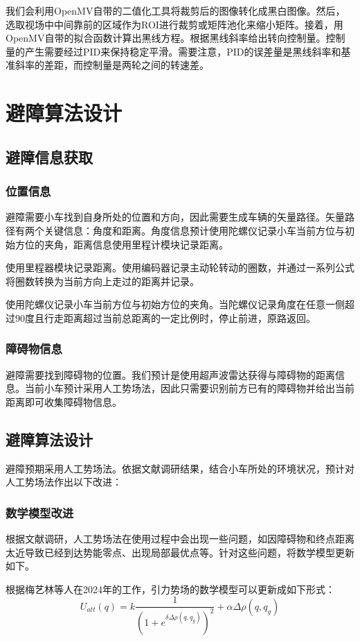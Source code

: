 \documentclass{report}
\begin{document}
我们会利用OpenMV自带的二值化工具将裁剪后的图像转化成黑白图像。然后，选取视场中中间靠前的区域作为ROI进行裁剪或矩阵池化来缩小矩阵。接着，用OpenMV自带的拟合函数计算出黑线方程。根据黑线斜率给出转向控制量。控制量的产生需要经过PID来保持稳定平滑。需要注意，PID的误差量是黑线斜率和基准斜率的差距，而控制量是两轮之间的转速差。
\section{避障算法设计}
\label{sec:label}
\subsection{避障信息获取}
\label{subsec:label}
\subsubsection{位置信息}
\label{subsec:label}
避障需要小车找到自身所处的位置和方向，因此需要生成车辆的矢量路径。矢量路径有两个关键信息：角度和距离。角度信息预计使用陀螺仪记录小车当前方位与初始方位的夹角，距离信息使用里程计模块记录距离。

使用里程器模块记录距离。使用编码器记录主动轮转动的圈数，并通过一系列公式将圈数转换为当前方向上走过的距离并记录。

使用陀螺仪记录小车当前方位与初始方位的夹角。当陀螺仪记录角度在任意一侧超过90度且行走距离超过当前总距离的一定比例时，停止前进，原路返回。

\subsubsection{障碍物信息}
\label{subsec:label}
避障需要找到障碍物的位置。我们预计是使用超声波雷达获得与障碍物的距离信息。当前小车预计采用人工势场法，因此只需要识别前方已有的障碍物并给出当前距离即可收集障碍物信息。
\subsection{避障算法设计}
\label{subsec:label}
避障预期采用人工势场法。依据文献调研结果，结合小车所处的环境状况，预计对人工势场法作出以下改进：
\subsubsection{数学模型改进}
\label{subsec:label}
根据文献调研，人工势场法在使用过程中会出现一些问题，如因障碍物和终点距离太近导致已经到达势能零点、出现局部最优点等。针对这些问题，将数学模型更新如下。

根据梅艺林等人在2024年的工作\cite{jh7}，引力势场的数学模型可以更新成如下形式：
\[ U_{att}(q)=k\frac1{\left(1+e^{\delta\Delta\rho(q,q_g)}\right)^2}+\alpha\Delta\rho(q,q_g) \]
\end{document}
